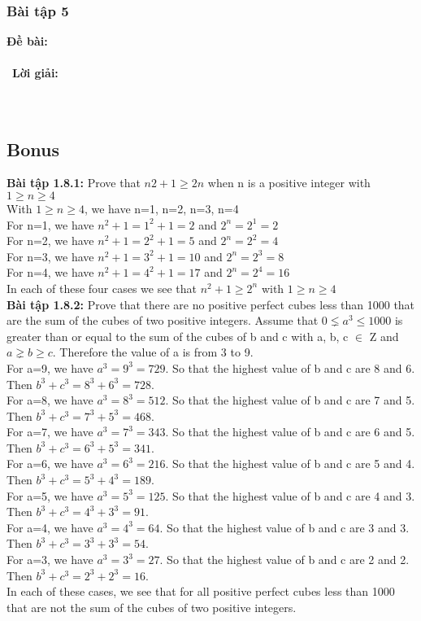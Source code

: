 \documentclass[a4paper]{article}
\begin{document}
\begin{enumerate}
\clearpage
\subsubsection{Bài tập 5}
\textbf{Đề bài:} 
\\\ \\\
\textbf{Lời giải:} \\\ \\\
\clearpage
\subsection{Bonus}
\textbf{Bài tập 1.8.1:} Prove that $n{2}+1 \geq 2{n}$ when n is a positive integer with $1\geq n \geq 4$\\
With  $1\geq n \geq 4$, we have n=1, n=2, n=3, n=4\\
For n=1, we have $n^{2}+1=1^{2}+1=2$ and $2^{n}=2^{1}=2$\\
For n=2, we have $n^{2}+1=2^{2}+1=5$ and $2^{n}=2^{2}=4$\\
For n=3, we have $n^{2}+1=3^{2}+1=10$ and $2^{n}=2^{3}=8$\\
For n=4, we have $n^{2}+1=4^{2}+1=17$ and $2^{n}=2^{4}=16$\\
In each of these four cases we see that $n^{2}+1 \geq 2^{n}$ with $1\geq n \geq 4$\\

\textbf{Bài tập 1.8.2:}  Prove that there are no positive perfect cubes less than 1000 that are the sum of the cubes of two positive integers.
Assume that $0\lneq a^{3} \le 1000$ is greater than or equal to the sum of the cubes of b and c with a, b, c $\in$ Z and $a\gneq b \geq c$. Therefore the value of a is from 3 to 9.\\
For a=9, we have $a^{3}=9^{3}=729$. So that the highest value of b and c are 8 and 6. Then $b^{3} + c^{3}=8^{3} + 6^{3}=728$.\\
For a=8, we have $ a^{3}=8^{3}=512$. So that the highest value of b and c are 7 and 5. Then $b^{3} + c^{3}=7^{3} + 5^{3}=468$.\\
For a=7, we have $a^{3}=7^{3}=343$. So that the highest value of b and c are 6 and 5. Then $b^{3} + c^{3}=6^{3} + 5^{3}=341$.\\
For a=6, we have $a^{3}=6^{3}=216$. So that the highest value of b and c are 5 and 4. Then $b^{3} + c^{3}=5^{3} + 4^{3}=189$.\\
For a=5, we have $a^{3}=5^{3}=125$. So that the highest value of b and c are 4 and 3. Then $b^{3} + c^{3}=4^{3} + 3^{3}=91$.\\
For a=4, we have $a^{3}=4^{3}=64$. So that the highest value of b and c are 3 and 3. Then $b^{3} + c^{3}=3^{3} + 3^{3}=54$.\\
For a=3, we have $a^{3}=3^{3}=27$. So that the highest value of b and c are 2 and 2. Then $b^{3} + c^{3}=2^{3} + 2^{3}=16$.\\
In each of these cases, we see that for all positive perfect cubes less than 1000 that are not the sum of the cubes of two positive integers.\\


\end{enumerate}
\end{document}
